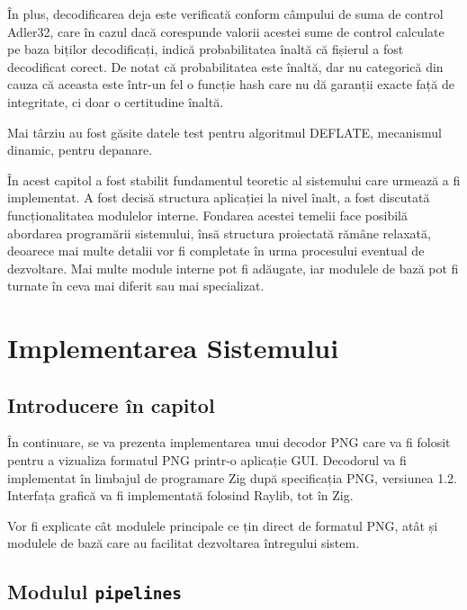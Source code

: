 \documentclass[a4paper,12pt]{report}
\begin{document}
În plus, decodificarea deja este verificată conform câmpului de suma de control Adler32,
care în cazul dacă corespunde valorii acestei sume de control calculate pe baza biților decodificați,
indică probabilitatea înaltă că fișierul a fost decodificat corect. 
De notat că probabilitatea este înaltă, dar nu categorică din cauza
că aceasta este într-un fel o funcție hash care nu dă garanții
exacte față de integritate, ci doar o certitudine înaltă.

Mai târziu au fost găsite datele test pentru algoritmul DEFLATE,
mecanismul dinamic, pentru depanare\cite{deflate_tests}.



În acest capitol a fost stabilit fundamentul teoretic al sistemului care urmează a fi implementat.
A fost decisă structura aplicației la nivel înalt, a fost discutată funcționalitatea modulelor interne.
Fondarea acestei temelii face posibilă abordarea programării sistemului,
însă structura proiectată rămâne relaxată, deoarece mai multe detalii
vor fi completate în urma procesului eventual de dezvoltare.
Mai multe module interne pot fi adăugate,
iar modulele de bază pot fi turnate în ceva mai diferit sau mai specializat.

\chapter{Implementarea Sistemului}\label{implementation_chapter_title}

\section{Introducere în capitol}

În continuare, se va prezenta implementarea unui decodor \ac{PNG} care va fi folosit pentru
a vizualiza formatul \ac{PNG} printr-o aplicație \ac{GUI}.
Decodorul va fi implementat în limbajul de programare Zig\cite{zig}
după specificația \ac{PNG}, versiunea 1.2\cite{png_spec}.
Interfața grafică va fi implementată folosind Raylib\cite{raylib}, tot în Zig.

Vor fi explicate cât modulele principale ce țin direct de formatul PNG,
atât și modulele de bază care au facilitat dezvoltarea întregului sistem.

\section{Modulul \texttt{pipelines}}
\end{document}
